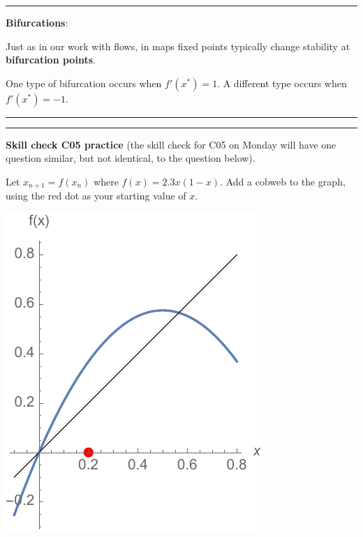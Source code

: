 \documentclass[12pt,letterpaper,noanswers]{exam}
\begin{document}
\vspace{2in}

\vspace{0.2cm}
\hrule
\vspace{0.2cm}

\noindent\textbf{Bifurcations}:
\begin{tcolorbox}
Just as in our work with flows, in maps fixed points typically change stability at \textbf{bifurcation points}.

One type of bifurcation occurs when $f'(x^*) = 1$.  A different type occurs when $f'(x^*) = -1$.
\end{tcolorbox}


\vspace{0.2cm}
\hrule
\vspace{0.2cm}
\eject



\vspace{0.2cm}
\hrule
\vspace{0.2cm}

\noindent\textbf{Skill check C05 practice} (the skill check for C05 on Monday will have one question similar, but not identical, to the question below).


\begin{questions}
\item Let $x_{n+1} = f(x_n)$ where $f(x) = 2.3x(1-x)$.  Add a cobweb to the graph, using the red dot as your starting value of $x$.

\includegraphics{img/C04-C05cobweb.pdf}

\end{questions}
\end{document}
